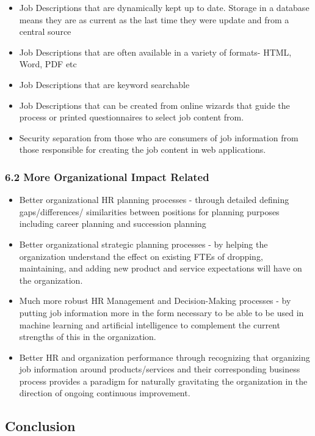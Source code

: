 \documentclass[12pt,letterpaper]{article}
\begin{document}
{{{\begin{itemize}
\item
  Job Descriptions that are dynamically kept up to date. Storage in a
  database means they are as current as the last time they were update
  and from a central source
\item
  Job Descriptions that are often available in a variety of formats-
  HTML, Word, PDF etc
\item
  Job Descriptions that are keyword searchable
\item
  Job Descriptions that can be created from online wizards that guide
  the process or printed questionnaires to select job content from.
\item
  Security separation from those who are consumers of job information
  from those responsible for creating the job content in web
  applications.
\end{itemize}

\subsubsection{6.2 More Organizational Impact
Related}

\begin{itemize}
\item
  Better organizational HR planning processes - through detailed
  defining gaps/differences/ similarities between positions for planning
  purposes including career planning and succession planning
\item
  Better organizational strategic planning processes - by helping the
  organization understand the effect on existing FTEs of dropping,
  maintaining, and adding new product and service expectations will have
  on the organization.
\item
  Much more robust HR Management and Decision-Making processes - by
  putting job information more in the form necessary to be able to be
  used in machine learning and artificial intelligence to complement the
  current strengths of this in the organization.
\item
  Better HR and organization performance through recognizing that
  organizing job information around products/services and their
  corresponding business process provides a paradigm for naturally
  gravitating the organization in the direction of ongoing continuous
  improvement.
\end{itemize}

\subsection{Conclusion}

}}}
\end{document}
